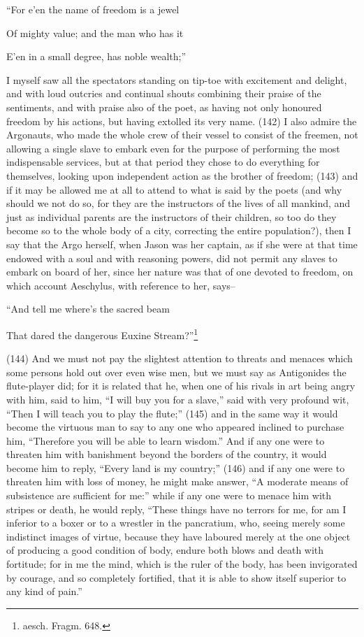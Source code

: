``For e'en the name of freedom is a jewel

Of mighty value; and the man who has it

E'en in a small degree, has noble wealth;''

I myself saw all the spectators standing on tip-toe with excitement and delight, and with loud
outcries and continual shouts combining their praise of the sentiments, and with praise also of the
poet, as having not only honoured freedom by his actions, but having extolled its very name. (142) I
also admire the Argonauts, who made the whole crew of their vessel to consist of the freemen, not
allowing a single slave to embark even for the purpose of performing the most indispensable
services, but at that period they chose to do everything for themselves, looking upon independent
action as the brother of freedom; (143) and if it may be allowed me at all to attend to what is said
by the poets (and why should we not do so, for they are the instructors of the lives of all mankind,
and just as individual parents are the instructors of their children, so too do they become so to the
whole body of a city, correcting the entire population?), then I say that the Argo herself, when
Jason was her captain, as if she were at that time endowed with a soul and with reasoning powers,
did not permit any slaves to embark on board of her, since her nature was that of one devoted to
freedom, on which account Aeschylus, with reference to her, says--

``And tell me where's the sacred beam

That dared the dangerous Euxine Stream?''\footnote{aesch. Fragm. 648.}

(144) And we must not pay the slightest attention to threats and menaces which some persons
hold out over even wise men, but we must say as Antigonides the flute-player did; for it is related
that he, when one of his rivals in art being angry with him, said to him, ``I will buy you for a slave,''
said with very profound wit, ``Then I will teach you to play the flute;'' (145) and in the same way it
would become the virtuous man to say to any one who appeared inclined to purchase him,
``Therefore you will be able to learn wisdom.'' And if any one were to threaten him with banishment
beyond the borders of the country, it would become him to reply, ``Every land is my country;'' (146)
and if any one were to threaten him with loss of money, he might make answer, ``A moderate
means of subsistence are sufficient for me:'' while if any one were to menace him with stripes or
death, he would reply, ``These things have no terrors for me, for am I inferior to a boxer or to a
wrestler in the pancratium, who, seeing merely some indistinct images of virtue, because they have
laboured merely at the one object of producing a good condition of body, endure both blows and
death with fortitude; for in me the mind, which is the ruler of the body, has been invigorated by
courage, and so completely fortified, that it is able to show itself superior to any kind of pain.''

